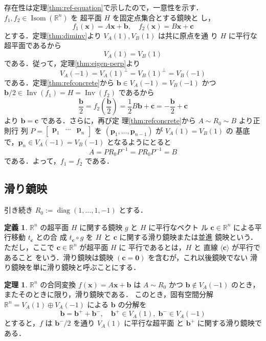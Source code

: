\documentclass[11pt, uplatex, dvipdfmx, titlepage]{jsarticle}
\makeatletter
\DeclareMathOperator{\Isom}{Isom}
\DeclareMathOperator{\Inv}{Inv}
\DeclareMathOperator{\diag}{diag}
\renewenvironment{proof}[1][\proofname]{\par
  \pushQED{\qed}%
  \normalfont \topsep6\p@\@plus6\p@\relax
  \trivlist
  \item[\hskip\labelsep
         \bfseries
    {#1}]\ignorespaces
}{%
  \popQED\endtrivlist\@endpefalse
}
\theoremstyle{definition}
\newtheorem{theorem}{定理}[section]
\newtheorem*{definition}{定義}
\renewcommand{\proofname}{\textbf{証明}}
\makeatother
\begin{document}
\begin{proof}
  
  存在性は定理\ref{thm:ref-equation}で示したので，一意性を示す．$f_1,
  f_2 \in \Isom(\mathbb{R}^n)$ を 超平面 $H$ を固定点集合とする鏡映と
  し，
  \[
    f_1(\bm{x}) = A\bm{x} + \bm{b}, \quad f_2(\bm{x}) = B\bm{x} + \bm{c}
  \]
  とする．定理\ref{thm:diminv}より $V_A(1), V_B(1)$ は共に原点を通
  り $H$ に平行な超平面であるから
  \[
    V_A(1) = V_B(1)
  \]
  である．従って，定理\ref{thm:eigen-perp}より
  \[
    V_A(-1) = V_A(1)^{\perp} = V_B(1)^{\perp} = V_B(-1)
  \]
  である．定理\ref{thm:refconcrete}から $\bm{b} \in
  V_A(-1) = V_B(-1)$ かつ $\bm{b}/2 \in \Inv(f_1) = H = \Inv(f_2)$ であるから
  \[
    \frac{\bm{b}}{2} = f_2\left( \frac{\bm{b}}{2}\right) = \frac{1}{2} B \bm{b} + \bm{c} 
    = -\frac{\bm{b}}{2} + \bm{c} 
  \]
  より $\bm{b} = \bm{c}$ である．さらに，再び定
  理\ref{thm:refconcrete}から $A \sim R_0 \sim B$ より正則行
  列 $P=\left[
    \begin{array}{ccc}
      \bm{p}_1 & \cdots & \bm{p}_n
    \end{array}
  \right]$ を $(\bm{p}_1, \ldots, \bm{p}_{n-1})$ が $V_A(1)=V_B(1)$ の
  基底で，$\bm{p}_n \in V_A(-1)=V_B(-1)$ となるようにとると
  \[
    A= P R_0 P^{-1} = P R_0 P^{-1} = B
  \]
  である．よって，$f_1 = f_2$ である．
\end{proof}

\subsection{滑り鏡映}\label{sec:glide}

引き続き $R_0:=\diag(1,\ldots, 1,-1)$ とする．

\begin{definition}
  $\mathbb{R}^n$ の超平面 $H$ に関する鏡映 $g$ と $H$ に平行なベクト
  ル $\bm{c} \in \mathbb{R}^n$ による平行移動 $t_{\bm{c}}$ との合
  成 $t_{\bm{c}} \circ g$ を $H$ と $\bm{c}$ に関する滑り鏡映または並進
  鏡映という．ただし，ここで $\bm{c} \in \mathbb{R}^n$ が超平面 $H$ に
  平行であるとは，$H$ と 直線 $\langle \bm{c} \rangle$ が平行であること
  をいう．滑り鏡映は鏡映 $(\bm{c}=\bm{0})$ を含むが，これ以後鏡映でない
  滑り鏡映を単に滑り鏡映と呼ぶことにする．
\end{definition}


\begin{theorem}\label{thm:glide}
  $\mathbb{R}^n$ の合同変換 $f(\bm{x}) = A\bm{x} + \bm{b}$ は $A \sim R_0$ かつ
  $\bm{b} \notin V_A(-1)$ のとき，またそのときに限り，滑り鏡映である．
  このとき，固有空間分解 $\mathbb{R}^n = V_A(1) \oplus V_A(-1)$ による $\bm{b}$ の分解を
  \begin{equation}\label{eq:eigendecomp-gen}
    \bm{b} = \bm{b}^{+} + \bm{b}^{-}, \quad \bm{b}^{+} \in V_A(1), \; \bm{b}^{-} \in V_A(-1)
  \end{equation}
  とすると，$f$ は $\bm{b}^{-}/2$ を通り $V_A(1)$ に平行な超平面
  と $\bm{b}^{+}$ に関する滑り鏡映である．
\end{theorem}
\end{document}
